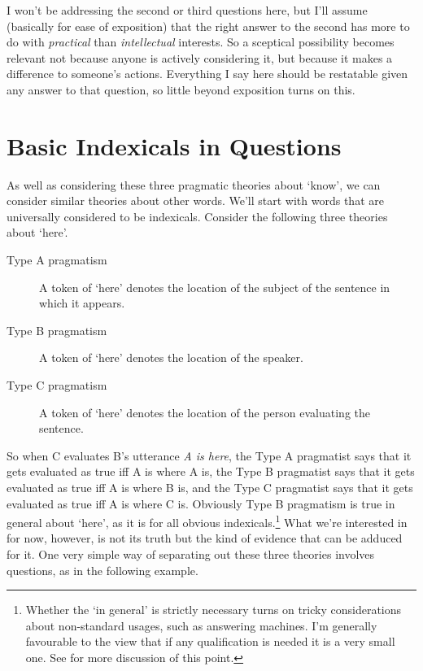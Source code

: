 I won't be addressing the second or third questions here, but I'll assume (basically for ease of exposition) that the right answer to the second has more to do with \textit{practical} than \textit{intellectual} interests. So a sceptical possibility becomes relevant not because anyone is actively considering it, but because it makes a difference to someone's actions. Everything I say here should be restatable given any answer to that question, so little beyond exposition turns on this.

\section{Basic Indexicals in Questions}

As well as considering these three pragmatic theories about `know', we can consider similar theories about other words. We'll start with words that are universally considered to be indexicals. Consider the following three theories about `here'.

\begin{description}
\item [Type A pragmatism] A token of `here' denotes the location of the subject of the sentence in which it appears.
\item [Type B pragmatism] A token of `here' denotes the location of the speaker.
\item [Type C pragmatism] A token of `here' denotes the location of the person evaluating the sentence.
\end{description}

\noindent So when C evaluates B's utterance \textit{A is here}, the Type A pragmatist says that it gets evaluated as true iff A is where A is, the Type B pragmatist says that it gets evaluated as true iff A is where B is, and the Type C pragmatist says that it gets evaluated as true iff A is where C is. Obviously Type B pragmatism is true in general about `here', as it is for all obvious indexicals.\footnote{Whether the `in general' is strictly necessary turns on tricky considerations about non-standard usages, such as answering machines. I'm generally favourable to the view that if any qualification is needed it is a very small one. See \citet{Weatherson2002-WEAMI} for more discussion of this point.} What we're interested in for now, however, is not its truth but the kind of evidence that can be adduced for it. One very simple way of separating out these three theories involves questions, as in the following example.

